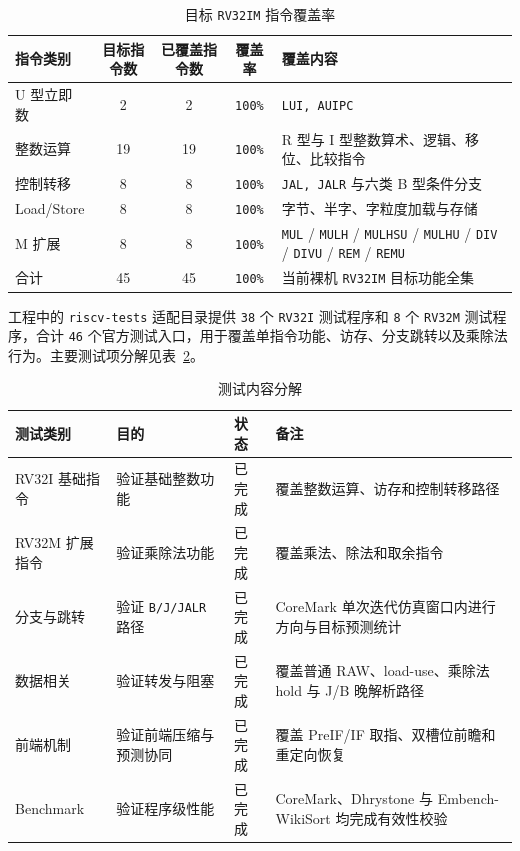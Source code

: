 ﻿\documentclass[12pt,a4paper]{ctexart}
\begin{document}
\begin{table}[H]
    \centering
    \caption{目标 \texttt{RV32IM} 指令覆盖率}
    \label{tab:validation_isa_coverage}
    \begin{tabularx}{\textwidth}{lcccX}
        \toprule
        指令类别 & 目标指令数 & 已覆盖指令数 & 覆盖率 & 覆盖内容 \\
        \midrule
        U 型立即数 & 2 & 2 & \texttt{100\%} & \texttt{LUI, AUIPC} \\
        整数运算 & 19 & 19 & \texttt{100\%} & R 型与 I 型整数算术、逻辑、移位、比较指令 \\
        控制转移 & 8 & 8 & \texttt{100\%} & \texttt{JAL, JALR} 与六类 B 型条件分支 \\
        Load/Store & 8 & 8 & \texttt{100\%} & 字节、半字、字粒度加载与存储 \\
        M 扩展 & 8 & 8 & \texttt{100\%} & \texttt{MUL} / \texttt{MULH} / \texttt{MULHSU} / \texttt{MULHU} / \texttt{DIV} / \texttt{DIVU} / \texttt{REM} / \texttt{REMU} \\
        \midrule
        合计 & 45 & 45 & \texttt{100\%} & 当前裸机 \texttt{RV32IM} 目标功能全集 \\
        \bottomrule
    \end{tabularx}
\end{table}

工程中的 \texttt{riscv-tests} 适配目录提供 \texttt{38} 个 \texttt{RV32I} 测试程序和 \texttt{8} 个 \texttt{RV32M} 测试程序，合计 \texttt{46} 个官方测试入口，用于覆盖单指令功能、访存、分支跳转以及乘除法行为。主要测试项分解见表~\ref{tab:validation_items}。

\begin{table}[H]
    \centering
    \caption{测试内容分解}
    \label{tab:validation_items}
    \begin{tabularx}{\textwidth}{l l l X}
        \toprule
        测试类别 & 目的 & 状态 & 备注 \\
        \midrule
        RV32I 基础指令 & 验证基础整数功能 & 已完成 & 覆盖整数运算、访存和控制转移路径 \\
        RV32M 扩展指令 & 验证乘除法功能 & 已完成 & 覆盖乘法、除法和取余指令 \\
        分支与跳转 & 验证 \texttt{B/J/JALR} 路径 & 已完成 & CoreMark 单次迭代仿真窗口内进行方向与目标预测统计 \\
        数据相关 & 验证转发与阻塞 & 已完成 & 覆盖普通 RAW、load-use、乘除法 hold 与 J/B 晚解析路径 \\
        前端机制 & 验证前端压缩与预测协同 & 已完成 & 覆盖 PreIF/IF 取指、双槽位前瞻和重定向恢复 \\
        Benchmark & 验证程序级性能 & 已完成 & CoreMark、Dhrystone 与 Embench-WikiSort 均完成有效性校验 \\
        \bottomrule
    \end{tabularx}
\end{table}
\end{document}
